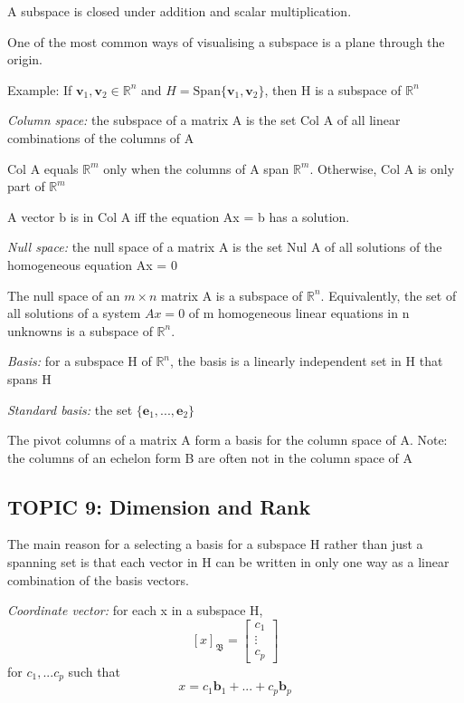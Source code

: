 \documentclass[12pt]{article} %
\newcommand{\R}{\mathbb{R}}
\begin{document}
A subspace is closed under addition and scalar multiplication. 

One of the most common ways of visualising a subspace is a plane through the origin. 

Example: If $\mathbf{v}_1, \mathbf{v}_2 \in \R^n$ and $H = \text{Span}\{\mathbf{v}_1, \mathbf{v}_2\}$, then H is a subspace of $\R^n$

\emph{Column space:} the subspace of a matrix A is the set Col A of all linear combinations of the columns of A

Col A equals $\R^m$ only when the columns of A span $\R^m$. Otherwise, Col A is only part of $\R^m$

A vector b is in Col A iff the equation Ax = b has a solution. 

\emph{Null space:} the null space of a matrix A is the set Nul A of all solutions of the homogeneous equation Ax = 0

The null space of an $m \times n$ matrix A is a subspace of $\R^n$. Equivalently, the set of all solutions of a system $Ax = 0$ of m homogeneous linear equations in n unknowns is a subspace of $\R^n$. 

\emph{Basis:} for a subspace H of $\R^n$, the basis is a linearly independent set in H that spans H

\emph{Standard basis:} the set $\{\mathbf{e}_1, ..., \mathbf{e}_2\}$

The pivot columns of a matrix A form a basis for the column space of A.
Note: the columns of an echelon form B are often not in the column space of A


\subsection{TOPIC 9: Dimension and Rank}
The main reason for a selecting a basis for a subspace H rather than just a spanning set is that each vector in H can be written in only one way as a linear combination of the basis vectors.

\emph{Coordinate vector:} for each x in a subspace H, 
$$[x]_\mathfrak{B} = \begin{bmatrix}
	c_1\\ \vdots \\ c_p
\end{bmatrix}$$
for $c_1, ... c_p$ such that 
$$x = c_1 \mathbf{b}_1 + ... + c_p \mathbf{b}_p$$
\end{document}
